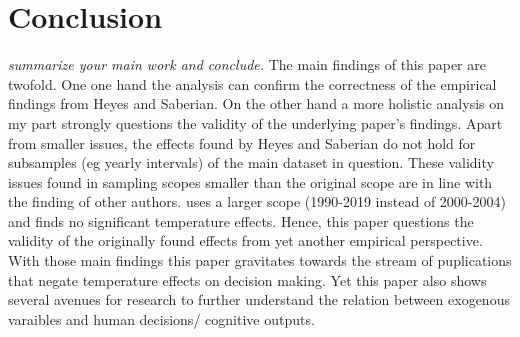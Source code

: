 \documentclass[11pt]{article}
\begin{document}
	\section{ Conclusion}
	\textit{	summarize your main work and conclude.}
	The main findings of this paper are twofold. One one hand the analysis can confirm the correctness of the empirical findings from Heyes and Saberian. On the other hand a more holistic analysis on my part strongly questions the validity of the underlying paper's findings. Apart from smaller issues, the effects found by Heyes and Saberian do not hold for subsamples (eg yearly intervals) of the main dataset in question. These validity issues found in sampling scopes smaller than the original scope are in line with the finding of other authors. \cite{Spamann.2020} uses a larger scope (1990-2019 instead of 2000-2004) and finds no significant temperature effects. Hence, this paper questions the validity of the originally found effects from yet another empirical perspective.
	With those main findings this paper gravitates towards the stream of puplications that negate temperature effects on decision making. Yet this paper also shows several avenues for research to further understand the relation between exogenous varaibles and human decisions/ cognitive outputs.
	
	\newpage
	
\end{document}
